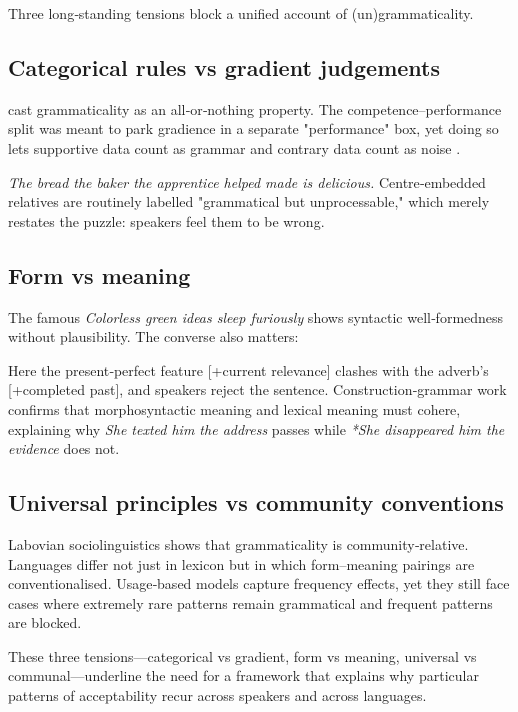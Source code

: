 \documentclass[12pt]{article}
\begin{document}
Three long‑standing tensions block a unified account of (un)grammaticality.

\subsection{Categorical rules vs gradient judgements}

\textcite{chomsky1957} cast grammaticality as an all‑or‑nothing property.  
The competence–performance split was meant to park gradience in a separate "performance" box, yet doing so lets supportive data count as grammar and contrary data count as noise \parencite[71]{schutze2016}.

\ea
\textit{The bread the baker the apprentice helped made is delicious.}
\z
Centre‑embedded relatives are routinely labelled "grammatical but unprocessable," which merely restates the puzzle: speakers feel them to be wrong.

\subsection{Form vs meaning}

The famous \textit{Colorless green ideas sleep furiously} shows syntactic well‑formedness without plausibility.  The converse also matters:

\z
Here the present‑perfect feature [+current relevance] clashes with the adverb's [+completed past], and speakers reject the sentence.  Construction‑grammar work \parencite{goldberg1995constructions} confirms that morphosyntactic meaning and lexical meaning must cohere, explaining why \textit{She texted him the address} passes while \textit{*She disappeared him the evidence} does not.

\subsection{Universal principles vs community conventions}

Labovian sociolinguistics \parencite{labov1972} shows that grammaticality is community‑relative.  Languages differ not just in lexicon but in which form–meaning pairings are conventionalised.  Usage‑based models capture frequency effects, yet they still face cases where extremely rare patterns remain grammatical and frequent patterns are blocked.

\medskip
These three tensions—categorical vs gradient, form vs meaning, universal vs communal—underline the need for a framework that explains why particular patterns of acceptability recur across speakers and across languages.
\end{document}
